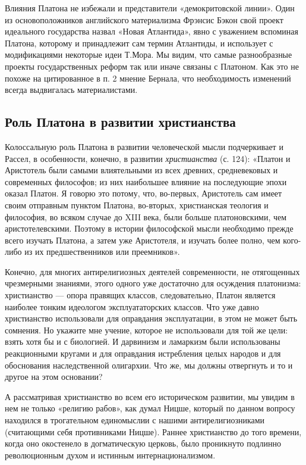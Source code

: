 Влияния Платона не избежали и представители «демокритовской линии».
Один из основоположников английского материализма Фрэнсис Бэкон свой
проект идеального государства назвал «Новая Атлантида», явно с
уважением вспоминая Платона, которому и принадлежит сам термин
Атлантиды, и использует с модификациями некоторые идеи Т.Мора. Мы
видим, что самые разнообразные проекты государственных реформ так или
иначе связаны с Платоном. Как это не похоже на цитированное в п. 2
мнение Бернала, что необходимость изменений всегда выдвигалась
материалистами.

\subsection{Роль Платона в развитии христианства}

Колоссальную роль Платона в развитии человеческой мысли подчеркивает и
Рассел, в особенности, конечно, в развитии \textit{христианства} (с.
124): «Платон и Аристотель были самыми влиятельными из всех древних,
средневековых и современных философов; из них наибольшее влияние на
последующие эпохи оказал Платон. Я говорю это потому, что, во-первых,
Аристотель сам имеет своим отправным пунктом Платона, во-вторых,
христианская теология и философия, во всяком случае до XIII века, были
больше платоновскими, чем аристотелевскими. Поэтому в истории
философской мысли необходимо прежде всего изучать Платона, а затем уже
Аристотеля, и изучать более полно, чем кого-либо из их
предшественников или преемников».

Конечно, для многих антирелигиозных деятелей современности, не
отягощенных чрезмерными знаниями, этого одного уже достаточно для
осуждения платонизма: христианство --- опора правящих классов,
следовательно, Платон является наиболее тонким идеологом
эксплуататорских классов. Что уже давно христианство использовали для
оправдания эксплуатации, в этом не может быть сомнения. Но укажите мне
учение, которое не использовали для той же цели: взять хотя бы и с
биологией. И дарвинизм и ламаркизм были использованы реакционными
кругами и для оправдания истребления целых народов и для обоснования
наследственной олигархии. Что же, мы должны отвергнуть и то и другое
на этом основании?

А рассматривая христианство во всем его историческом развитии, мы
увидим в нем не только «религию рабов», как думал Ницше, который по
данном вопросу находился в трогательном единомыслии с нашими
антирелигиозниками (считающими себя противниками Ницше). Раннее
христианство до того времени, когда оно окостенело в догматическую
церковь, было проникнуто подлинно революционным духом и истинным
интернационализмом.

